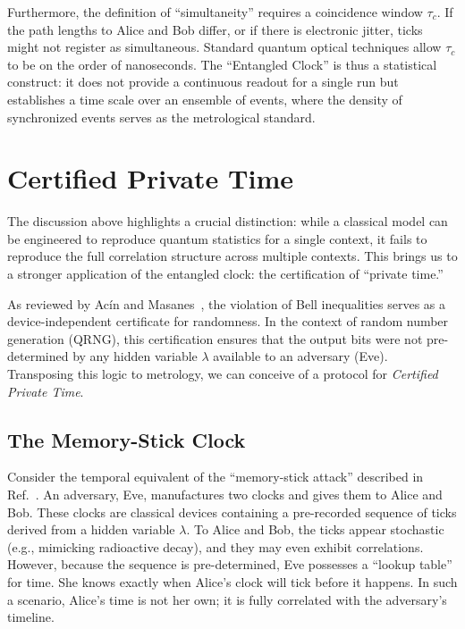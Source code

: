 \documentclass[entropy,article,submit,moreauthors,pdftex]{Definitions/mdpi}
\begin{document}
Furthermore, the definition of ``simultaneity'' requires a coincidence window $\tau_c$. If the path lengths to Alice and Bob differ, or if there is electronic jitter, ticks might not register as simultaneous. Standard quantum optical techniques allow $\tau_c$ to be on the order of nanoseconds. The ``Entangled Clock'' is thus a statistical construct: it does not provide a continuous readout for a single run but establishes a time scale over an ensemble of events, where the density of synchronized events serves as the metrological standard.

\section{Certified Private Time}

The discussion above highlights a crucial distinction: while a classical model can be engineered to reproduce quantum statistics for a single context, it fails to reproduce the full correlation structure across multiple contexts. This brings us to a stronger application of the entangled clock: the certification of ``private time.''

As reviewed by Ac\'in and Masanes~\cite{Acin2016CertifiedRandomness}, the violation of Bell inequalities serves as a device-independent certificate for randomness. In the context of random number generation (QRNG), this certification ensures that the output bits were not pre-determined by any hidden variable $\lambda$ available to an adversary (Eve). Transposing this logic to metrology, we can conceive of a protocol for \emph{Certified Private Time}.

\subsection{The Memory-Stick Clock}
Consider the temporal equivalent of the ``memory-stick attack'' described in Ref.~\cite{Acin2016CertifiedRandomness}. An adversary, Eve, manufactures two clocks and gives them to Alice and Bob. These clocks are classical devices containing a pre-recorded sequence of ticks derived from a hidden variable $\lambda$. To Alice and Bob, the ticks appear stochastic (e.g., mimicking radioactive decay), and they may even exhibit correlations. However, because the sequence is pre-determined, Eve possesses a ``lookup table'' for time. She knows exactly when Alice's clock will tick before it happens. In such a scenario, Alice's time is not her own; it is fully correlated with the adversary's timeline.
\end{document}
